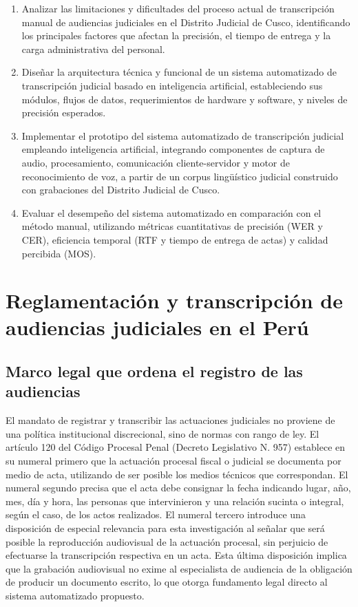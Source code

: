 \documentclass[12pt,a4paper,oneside]{article}
\begin{document}
\begin{enumerate}[label=\alph*)]
  \item Analizar las limitaciones y dificultades del proceso actual de transcripci\'on manual de audiencias judiciales en el Distrito Judicial de Cusco, identificando los principales factores que afectan la precisi\'on, el tiempo de entrega y la carga administrativa del personal.
  \item Dise\~nar la arquitectura t\'ecnica y funcional de un sistema automatizado de transcripci\'on judicial basado en inteligencia artificial, estableciendo sus m\'odulos, flujos de datos, requerimientos de hardware y software, y niveles de precisi\'on esperados.
  \item Implementar el prototipo del sistema automatizado de transcripci\'on judicial empleando inteligencia artificial, integrando componentes de captura de audio, procesamiento, comunicaci\'on cliente-servidor y motor de reconocimiento de voz, a partir de un corpus ling\"u\'istico judicial construido con grabaciones del Distrito Judicial de Cusco.
  \item Evaluar el desempe\~no del sistema automatizado en comparaci\'on con el m\'etodo manual, utilizando m\'etricas cuantitativas de precisi\'on (WER y CER), eficiencia temporal (RTF y tiempo de entrega de actas) y calidad percibida (MOS).
\end{enumerate}


\section{Reglamentaci\'on y transcripci\'on de audiencias judiciales en el Per\'u}

\subsection{Marco legal que ordena el registro de las audiencias}

El mandato de registrar y transcribir las actuaciones judiciales no proviene de una pol\'itica institucional discrecional, sino de normas con rango de ley. El art\'iculo 120 del C\'odigo Procesal Penal (Decreto Legislativo N.\textordmasculine{} 957) establece en su numeral primero que la actuaci\'on procesal fiscal o judicial se documenta por medio de acta, utilizando de ser posible los medios t\'ecnicos que correspondan. El numeral segundo precisa que el acta debe consignar la fecha indicando lugar, a\~no, mes, d\'ia y hora, las personas que intervinieron y una relaci\'on sucinta o integral, seg\'un el caso, de los actos realizados. El numeral tercero introduce una disposici\'on de especial relevancia para esta investigaci\'on al se\~nalar que ser\'a posible la reproducci\'on audiovisual de la actuaci\'on procesal, sin perjuicio de efectuarse la transcripci\'on respectiva en un acta. Esta \'ultima disposici\'on implica que la grabaci\'on audiovisual no exime al especialista de audiencia de la obligaci\'on de producir un documento escrito, lo que otorga fundamento legal directo al sistema automatizado propuesto.
\end{document}
